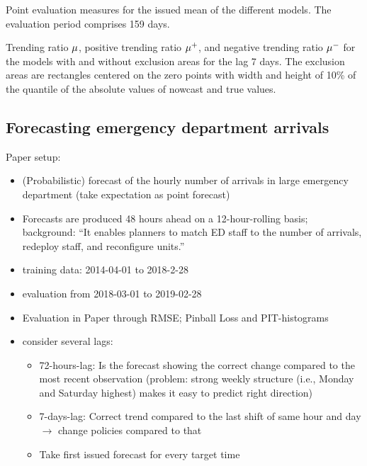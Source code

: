\begin{table}[]
    \centering
    
    \caption{Point evaluation measures for the issued mean of the different models. The evaluation period comprises 159 days. }
    \label{tab:app-covid-rmse}
\end{table}


\begin{table}
    \centering
    \tiny
    
    \caption{Trending ratio $\mu$, positive trending ratio $\mu^+$, and negative trending ratio $\mu^-$ for the models with and without exclusion areas for the lag 7 days. The exclusion areas are rectangles centered on the zero points with width and height of 10\% of the quantile of the absolute values of nowcast and true values. }
    \label{tab:app-covid-trending-ratios-lag-7}
\end{table}

\newpage
\subsection{Forecasting emergency department arrivals}\label{sec:application-eda}

\textcite{Rostami-Tabar2023}

Paper setup:

\begin{itemize}
    \item (Probabilistic) forecast of the hourly number of arrivals in large emergency department (take expectation as point forecast)
    \item Forecasts are produced 48 hours ahead on a 12-hour-rolling basis; background: \enquote{It enables planners to match ED staff to the number of arrivals, redeploy staff, and reconfigure units.}
    \item training data: 2014-04-01 to 2018-2-28
    \item evaluation from 2018-03-01 to 2019-02-28
    \item Evaluation in Paper through RMSE; Pinball Loss and PIT-histograms
    \item consider several lags:
    \begin{itemize}
        \item 72-hours-lag: Is the forecast showing the correct change compared to the most recent observation (problem: strong weekly structure (i.e., Monday and Saturday highest) makes it easy to predict right direction)
        \item 7-days-lag: Correct trend compared to the last shift of same hour and day $\rightarrow$ change policies compared to that
        \item Take first issued forecast for every target time
    \end{itemize}
\end{itemize}

